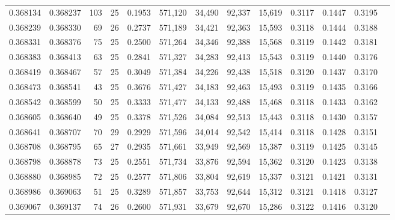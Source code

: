 \begin{tabular}{rrrrrrrrrrrrr}
0.368134 & 0.368237 &   103 &  25 &                                     0.1953 & 571,120 &  34,490 &  92,337 &  15,619 & 0.3117 & 0.1447 & 0.3195 \\
0.368239 & 0.368330 &    69 &  26 &                                     0.2737 & 571,189 &  34,421 &  92,363 &  15,593 & 0.3118 & 0.1444 & 0.3188 \\
0.368331 & 0.368376 &    75 &  25 &                                     0.2500 & 571,264 &  34,346 &  92,388 &  15,568 & 0.3119 & 0.1442 & 0.3181 \\
0.368383 & 0.368413 &    63 &  25 &                                     0.2841 & 571,327 &  34,283 &  92,413 &  15,543 & 0.3119 & 0.1440 & 0.3176 \\
0.368419 & 0.368467 &    57 &  25 &                                     0.3049 & 571,384 &  34,226 &  92,438 &  15,518 & 0.3120 & 0.1437 & 0.3170 \\
0.368473 & 0.368541 &    43 &  25 &                                     0.3676 & 571,427 &  34,183 &  92,463 &  15,493 & 0.3119 & 0.1435 & 0.3166 \\
0.368542 & 0.368599 &    50 &  25 &                                     0.3333 & 571,477 &  34,133 &  92,488 &  15,468 & 0.3118 & 0.1433 & 0.3162 \\
0.368605 & 0.368640 &    49 &  25 &                                     0.3378 & 571,526 &  34,084 &  92,513 &  15,443 & 0.3118 & 0.1430 & 0.3157 \\
0.368641 & 0.368707 &    70 &  29 &                                     0.2929 & 571,596 &  34,014 &  92,542 &  15,414 & 0.3118 & 0.1428 & 0.3151 \\
0.368708 & 0.368795 &    65 &  27 &                                     0.2935 & 571,661 &  33,949 &  92,569 &  15,387 & 0.3119 & 0.1425 & 0.3145 \\
0.368798 & 0.368878 &    73 &  25 &                                     0.2551 & 571,734 &  33,876 &  92,594 &  15,362 & 0.3120 & 0.1423 & 0.3138 \\
0.368880 & 0.368985 &    72 &  25 &                                     0.2577 & 571,806 &  33,804 &  92,619 &  15,337 & 0.3121 & 0.1421 & 0.3131 \\
0.368986 & 0.369063 &    51 &  25 &                                     0.3289 & 571,857 &  33,753 &  92,644 &  15,312 & 0.3121 & 0.1418 & 0.3127 \\
0.369067 & 0.369137 &    74 &  26 &                                     0.2600 & 571,931 &  33,679 &  92,670 &  15,286 & 0.3122 & 0.1416 & 0.3120 \\

\end{tabular}
